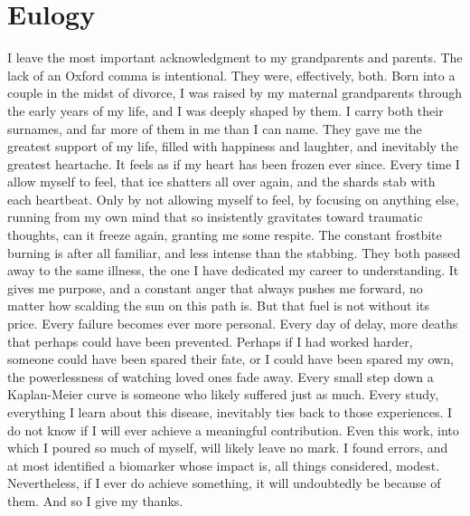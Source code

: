 \chapter*{Eulogy}

 I leave the most important acknowledgment to my grandparents and parents. The lack of an Oxford comma is intentional. They were, effectively, both. Born into a couple in the midst of divorce, I was raised by my maternal grandparents through the early years of my life, and I was deeply shaped by them. I carry both their surnames, and far more of them in me than I can name. They gave me the greatest support of my life, filled with happiness and laughter, and inevitably the greatest heartache. It feels as if my heart has been frozen ever since. Every time I allow myself to feel, that ice shatters all over again, and the shards stab with each heartbeat. Only by not allowing myself to feel, by focusing on anything else, running from my own mind that so insistently gravitates toward traumatic thoughts, can it freeze again, granting me some respite. The constant frostbite burning is after all familiar, and less intense than the stabbing. They both passed away to the same illness, the one I have dedicated my career to understanding. It gives me purpose, and a constant anger that always pushes me forward, no matter how scalding the sun on this path is. But that fuel is not without its price. Every failure becomes ever more personal. Every day of delay, more deaths that perhaps could have been prevented. Perhaps if I had worked harder, someone could have been spared their fate, or I could have been spared my own, the powerlessness of watching loved ones fade away. Every small step down a Kaplan-Meier curve is someone who likely suffered just as much. Every study, everything I learn about this disease, inevitably ties back to those experiences. I do not know if I will ever achieve a meaningful contribution. Even this work, into which I poured so much of myself, will likely leave no mark. I found errors, and at most identified a biomarker whose impact is, all things considered, modest. Nevertheless, if I ever do achieve something, it will undoubtedly be because of them. And so I give my thanks.
 \\
 \\
